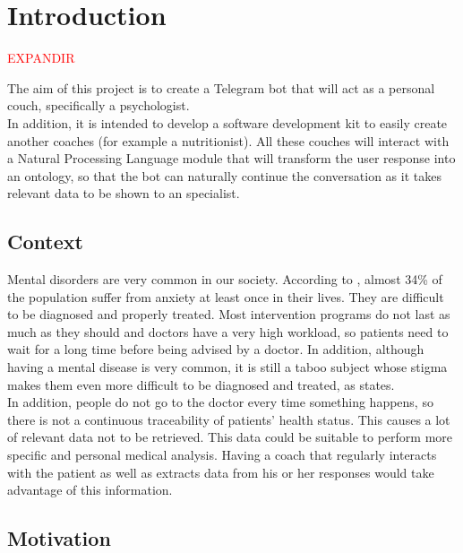 \documentclass[12pt,english]{article}
\begin{document}


\thispagestyle{empty}
\newpage
\tableofcontents{}
\newpage
\listoffigures
\thispagestyle{empty}
\newpage

\section{Introduction}

\textcolor{red}{EXPANDIR}

The aim of this project is to create a Telegram bot that will act as a personal couch, specifically a psychologist.\\

In addition, it is intended to develop a software development kit to easily create another coaches (for example a nutritionist). All these couches will interact with a Natural Processing Language module that will transform the user response into an ontology, so that the bot can naturally continue the conversation as it takes relevant data to be shown to an specialist.

\subsection{Context}

Mental disorders are very common in our society. According to \cite{Bandelow2015}, almost 34\% of the population suffer from anxiety at least once in their lives. They are difficult to be diagnosed and properly treated. Most intervention programs do not last as much as they should and doctors have a very high workload, so patients need to wait for a long time before being advised by a doctor. In addition, although having a mental disease is very common, it is still a taboo subject whose stigma makes them even more difficult to be diagnosed and treated, as \cite{Davies2000} states.\\

In addition, people do not go to the doctor every time something happens, so there is not a continuous traceability of patients' health status. This causes a lot of relevant data not to be retrieved. This data could be suitable to perform more specific and personal medical analysis. Having a coach that regularly interacts with the patient as well as extracts data from his or her responses would take advantage of this information.


\subsection{Motivation}
\end{document}
